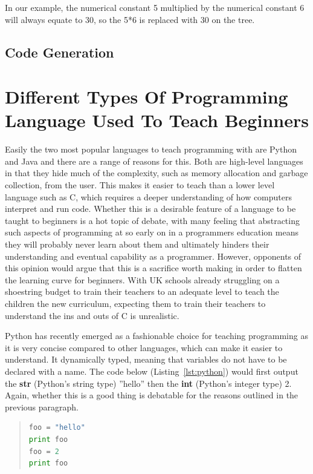\documentclass[ %
                    author={Jonathan Rankin},
                supervisor={Dr. David May, Dr. Ian Holyer},
                    degree={MEng},
                     title={CodeTouch},
                  subtitle={A Revolutionary Way To Program Real Code On Touch Screen Devices},
                      type={enterprise},
                      year={2015 } ]{dissertation}
\begin{document}
In our example, the numerical constant 5 multiplied by the numerical constant 6 will always equate to 30, so the 5*6 is replaced with 30 on the tree.


\subsection{Code Generation}


\section{Different Types Of Programming Language Used To Teach Beginners}\label{sec:teachL}

Easily the two most popular languages to teach programming with are Python and Java \cite{javapython}and there are a range of reasons for this. Both are high-level languages in that they hide much of the complexity, such as memory allocation and garbage collection, from the user. This makes it easier to teach than a lower level language such as C, which requires a deeper understanding of how computers interpret and run code. Whether this is a desirable feature of a language to be taught to beginners is a hot topic of debate, with many feeling that abstracting such aspects of programming at so early on in a programmers education means they will probably never learn about them and ultimately hinders their understanding and eventual capability as a programmer. However, opponents of this opinion would argue that this is a sacrifice worth making in order to flatten the learning curve for beginners. With UK schools already struggling on a shoestring budget to train their teachers to an adequate level to teach the children the new curriculum, expecting them to train their teachers to understand the ins and outs of C is unrealistic. 

Python has recently emerged as a fashionable choice for teaching programming as it is very concise compared to other languages, which can make it easier to understand. It dynamically typed, meaning that variables do not have to be declared with a name. The code below (Listing~\ref{lst:python}) would first output the \textbf{str} (Python's string type) ''hello'' then the \textbf{int} (Python's integer type) 2. Again, whether this is a good thing is debatable for the reasons outlined in the previous paragraph. 

\begin{quote}
\begin{lstlisting}[caption={Example Python code},label={lst:python},language=Python]
foo = "hello"
print foo
foo = 2
print foo
\end{lstlisting}
\label{lst:label}
\end{quote}
\end{document}
